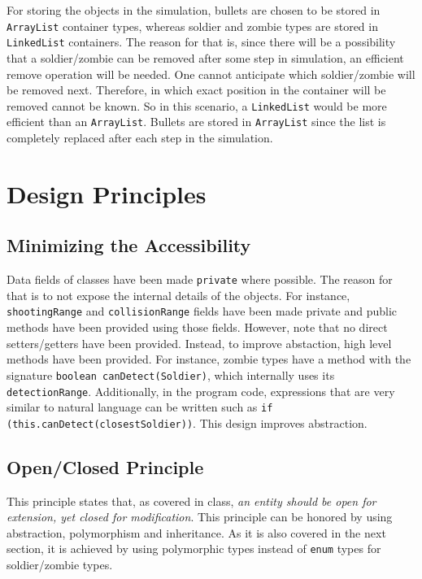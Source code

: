 \documentclass[12pt]{article}
\begin{document}
For storing the objects in the simulation, bullets are chosen to be
  stored in \texttt{ArrayList} container types, whereas soldier
  and zombie types are stored in \texttt{LinkedList} containers.
  The reason for that is, since there will be a possibility that
  a soldier/zombie can be removed after some step in simulation,
  an efficient remove operation will be needed. One cannot anticipate
  which soldier/zombie will be removed next. Therefore, in which
  exact position in the container will be removed cannot be known.
  So in this scenario, a \texttt{LinkedList} would be more efficient
  than an \texttt{ArrayList}. Bullets are stored in \texttt{ArrayList}
  since the list is completely replaced after each step in the
  simulation.


\section{Design Principles}

\subsection{Minimizing the Accessibility}
Data fields of classes have been made \texttt{private} where
  possible. The reason for that is to not expose the internal
  details of the objects. For instance, \texttt{shootingRange}
  and \texttt{collisionRange} fields have been made private
  and public methods have been provided using those fields.
  However, note that no direct setters/getters have been provided.
  Instead, to improve abstaction, high level methods have been
  provided. For instance, zombie types have a method with the
  signature \texttt{boolean canDetect(Soldier)}, which internally
  uses its \texttt{detectionRange}. Additionally, in the program
  code, expressions that are very similar to natural language
  can be written such as \texttt{if (this.canDetect(closestSoldier))}.
  This design improves abstraction.

\subsection{Open/Closed Principle}
This principle states that, as covered in class, \emph{an entity
  should be open for extension, yet closed for modification}.
  This principle can be honored by using abstraction, polymorphism
  and inheritance. As it is also covered in the next section,
  it is achieved by using polymorphic types instead of \texttt{enum}
  types for soldier/zombie types.
\end{document}
